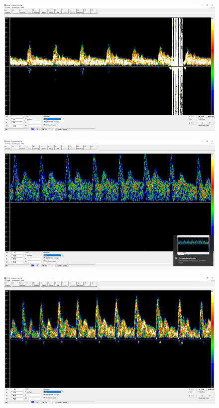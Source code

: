 \documentclass[11pt]{scrartcl}
\begin{document}
    \begin{figure}[H]
        \includegraphics[width=16cm]{images/Chris_Hals.png}
    \end{figure}
    \begin{figure}[H]
        \includegraphics[width=16cm]{images/Chris_Handgelenk.png}
    \end{figure}
    \begin{figure}[H]
        \includegraphics[width=16cm]{images/Leona_Hals.png}
    \end{figure}
\end{document}
